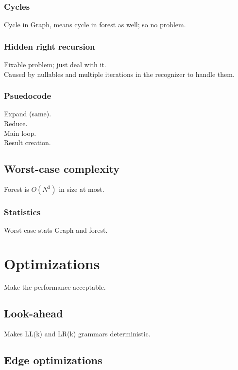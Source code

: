 \documentclass[a4paper,10pt]{article}
\begin{document}
\subsubsection{Cycles}

Cycle in Graph, means cycle in forest as well; so no problem.

\subsubsection{Hidden right recursion}

Fixable problem; just deal with it.\\
Caused by nullables and multiple iterations in the recognizer to handle them.

\subsubsection{Psuedocode}

Expand (same).\\
Reduce.\\
Main loop.\\
Result creation.

\subsection{Worst-case complexity}

Forest is $O(N^3)$ in size at most.

\subsubsection{Statistics}

Worst-case stats Graph and forest.

\section{Optimizations}

Make the performance acceptable.

\subsection{Look-ahead}

Makes LL(k) and LR(k) grammars deterministic.

\subsection{Edge optimizations}
\end{document}
